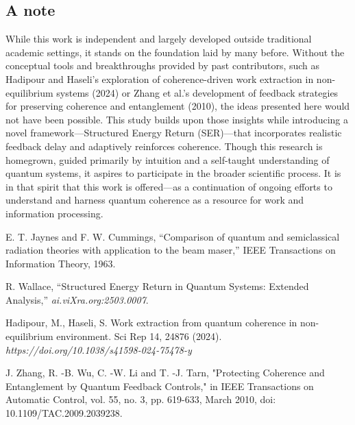 \documentclass[a4paper,11pt]{article}
\begin{document}
\subsection{A note}
While this work is independent and largely developed outside traditional academic settings, it stands on the foundation laid by many before. Without the conceptual tools and breakthroughs provided by past contributors, such as Hadipour and Haseli's \cite{Hadipour} exploration of coherence-driven work extraction in non-equilibrium systems (2024) or Zhang et al.'s \cite{protecting} development of feedback strategies for preserving coherence and entanglement (2010), the ideas presented here would not have been possible. This study builds upon those insights while introducing a novel framework—Structured Energy Return (SER)—that incorporates realistic feedback delay and adaptively reinforces coherence. Though this research is homegrown, guided primarily by intuition and a self-taught understanding of quantum systems, it aspires to participate in the broader scientific process. It is in that spirit that this work is offered—as a continuation of ongoing efforts to understand and harness quantum coherence as a resource for work and information processing.

\begin{thebibliography}{9}
E. T. Jaynes and F. W. Cummings, “Comparison of quantum and semiclassical radiation theories with application to the beam maser,” IEEE Transactions on Information Theory, 1963.

R. Wallace, “Structured Energy Return in Quantum Systems: Extended Analysis,” \textit{ai.viXra.org:2503.0007}.

Hadipour, M., Haseli, S. Work extraction from quantum coherence in non-equilibrium environment. Sci Rep 14, 24876 (2024).
 \textit{https://doi.org/10.1038/s41598-024-75478-y}

J. Zhang, R. -B. Wu, C. -W. Li and T. -J. Tarn, "Protecting Coherence and Entanglement by Quantum Feedback Controls," in IEEE Transactions on Automatic Control, vol. 55, no. 3, pp. 619-633, March 2010, doi: 10.1109/TAC.2009.2039238. 
\end{thebibliography}
\end{document}

